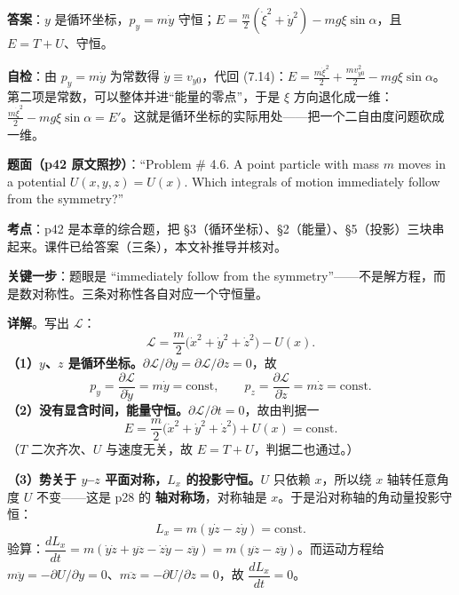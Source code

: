 \documentclass[11pt]{ctexart}
\begin{document}
\textbf{答案}：$y$ 是循环坐标，$p_y=m\dot y$ 守恒；$E=\frac{m}{2}(\dot\xi^2+\dot y^2)-mg\xi\sin\alpha$，且 $E=T+U$、守恒。

\textbf{自检}：由 $p_y=m\dot y$ 为常数得 $\dot y\equiv v_{y0}$，代回 (7.14)：$E=\frac{m\dot\xi^2}{2}+\frac{mv_{y0}^2}{2}-mg\xi\sin\alpha$。第二项是常数，可以整体并进“能量的零点”，于是 $\xi$ 方向退化成一维：$\frac{m\dot\xi^2}{2}-mg\xi\sin\alpha=E'$。这就是循环坐标的实际用处——把一个二自由度问题砍成一维。


\textbf{题面（p42 原文照抄）}：“Problem \# 4.6. A point particle with mass $m$ moves in a potential $U(x,y,z)=U(x)$. Which integrals of motion immediately follow from the symmetry?”

\textbf{考点}：p42 是本章的综合题，把 §3（循环坐标）、§2（能量）、§5（投影）三块串起来。课件已给答案（三条），本文补推导并核对。

\textbf{关键一步}：题眼是 “immediately follow from the symmetry”——不是解方程，而是数对称性。三条对称性各自对应一个守恒量。

\textbf{详解}。写出 $\mathcal{L}$：
\[
\mathcal{L}=\frac{m}{2}\bigl(\dot x^2+\dot y^2+\dot z^2\bigr)-U(x). \tag{7.15}
\]
\textbf{（1）$y$、$z$ 是循环坐标。}$\partial\mathcal{L}/\partial y=\partial\mathcal{L}/\partial z=0$，故
\[
p_y=\frac{\partial\mathcal{L}}{\partial\dot y}=m\dot y=\text{const},\qquad
p_z=\frac{\partial\mathcal{L}}{\partial\dot z}=m\dot z=\text{const}. \tag{7.16}
\]
\textbf{（2）没有显含时间，能量守恒。}$\partial\mathcal{L}/\partial t=0$，故由判据一
\[
E=\frac{m}{2}\bigl(\dot x^2+\dot y^2+\dot z^2\bigr)+U(x)=\text{const}. \tag{7.17}
\]
（$T$ 二次齐次、$U$ 与速度无关，故 $E=T+U$，判据二也通过。）

\textbf{（3）势关于 $y$--$z$ 平面对称，$L_x$ 的投影守恒。}$U$ 只依赖 $x$，所以绕 $x$ 轴转任意角度 $U$ 不变——这是 p28 的 \textbf{轴对称场}，对称轴是 $x$。于是沿对称轴的角动量投影守恒：
\[
L_x=m(y\dot z-z\dot y)=\text{const}. \tag{7.18}
\]
验算：$\dfrac{dL_x}{dt}=m(\dot y\dot z+y\ddot z-\dot z\dot y-z\ddot y)=m(y\ddot z-z\ddot y)$。而运动方程给 $m\ddot y=-\partial U/\partial y=0$、$m\ddot z=-\partial U/\partial z=0$，故 $\dfrac{dL_x}{dt}=0$。

\end{document}
